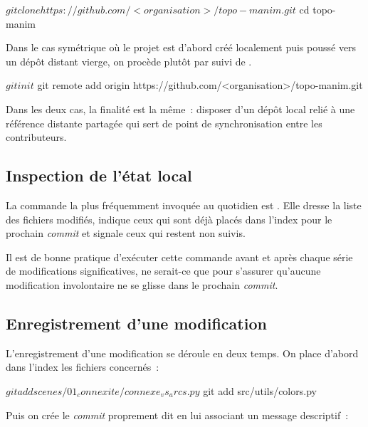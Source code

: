 \documentclass[12pt, a4paper, openany]{report}
\begin{document}
	\begin{terminal}
$ git clone https://github.com/<organisation>/topo-manim.git
$ cd topo-manim
	\end{terminal}

	Dans le cas symétrique où le projet est d’abord créé localement puis poussé vers un dépôt distant vierge, on procède plutôt par  suivi de .

	\begin{terminal}
$ git init
$ git remote add origin https://github.com/<organisation>/topo-manim.git
	\end{terminal}

	Dans les deux cas, la finalité est la même~: disposer d’un dépôt local relié à une référence distante partagée qui sert de point de synchronisation entre les contributeurs.

	\subsection{Inspection de l’état local}

	La commande la plus fréquemment invoquée au quotidien est . Elle dresse la liste des fichiers modifiés, indique ceux qui sont déjà placés dans l’index pour le prochain \textit{commit} et signale ceux qui restent non suivis.


	Il est de bonne pratique d’exécuter cette commande avant et après chaque série de modifications significatives, ne serait-ce que pour s’assurer qu’aucune modification involontaire ne se glisse dans le prochain \textit{commit}.

	\subsection{Enregistrement d’une modification}

	L’enregistrement d’une modification se déroule en deux temps. On place d’abord dans l’index les fichiers concernés~:

	\begin{terminal}
$ git add scenes/01_connexite/connexe_vs_arcs.py
$ git add src/utils/colors.py
	\end{terminal}

	Puis on crée le \textit{commit} proprement dit en lui associant un message descriptif~:
\end{document}
